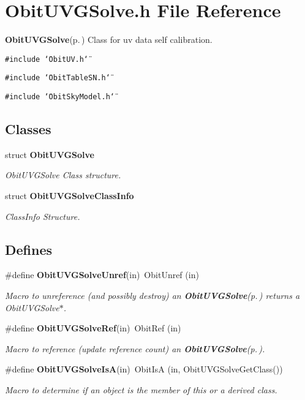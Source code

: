\section{Obit\-UVGSolve.h File Reference}
\label{ObitUVGSolve_8h}
{\bf Obit\-UVGSolve}{\rm (p.\,\pageref{structObitUVGSolve})} Class for uv data self calibration. 

{\tt \#include \char`\"{}Obit\-UV.h\char`\"{}}\par
{\tt \#include \char`\"{}Obit\-Table\-SN.h\char`\"{}}\par
{\tt \#include \char`\"{}Obit\-Sky\-Model.h\char`\"{}}\par
\subsection*{Classes}
\begin{CompactItemize}
\item 
struct {\bf Obit\-UVGSolve}
\begin{CompactList}\small\item\em Obit\-UVGSolve Class structure. \item\end{CompactList}\item 
struct {\bf Obit\-UVGSolve\-Class\-Info}
\begin{CompactList}\small\item\em Class\-Info Structure. \item\end{CompactList}\end{CompactItemize}
\subsection*{Defines}
\begin{CompactItemize}
\item 
\#define {\bf Obit\-UVGSolve\-Unref}(in)\ Obit\-Unref (in)
\begin{CompactList}\small\item\em Macro to unreference (and possibly destroy) an {\bf Obit\-UVGSolve}{\rm (p.\,\pageref{structObitUVGSolve})} returns a Obit\-UVGSolve$\ast$. \item\end{CompactList}\item 
\#define {\bf Obit\-UVGSolve\-Ref}(in)\ Obit\-Ref (in)
\begin{CompactList}\small\item\em Macro to reference (update reference count) an {\bf Obit\-UVGSolve}{\rm (p.\,\pageref{structObitUVGSolve})}. \item\end{CompactList}\item 
\#define {\bf Obit\-UVGSolve\-Is\-A}(in)\ Obit\-Is\-A (in, Obit\-UVGSolve\-Get\-Class())
\begin{CompactList}\small\item\em Macro to determine if an object is the member of this or a derived class. \item\end{CompactList}\end{CompactItemize}

